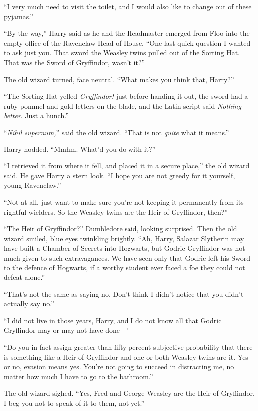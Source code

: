 “I very much need to visit the toilet, and I would also like to change out of these pyjamas.”

\later

“By the way,” Harry said as he and the Headmaster emerged from Floo into the empty office of the Ravenclaw Head of House. “One last quick question I wanted to ask just you. That sword the Weasley twins pulled out of the Sorting Hat. That was the Sword of Gryffindor, wasn’t it?”

The old wizard turned, face neutral. “What makes you think that, Harry?”

“The Sorting Hat yelled \emph{Gryffindor!} just before handing it out, the sword had a ruby pommel and gold letters on the blade, and the Latin script said \emph{Nothing better}. Just a hunch.”

“\emph{Nihil supernum,}” said the old wizard. “That is not \emph{quite} what it means.”

Harry nodded. “Mmhm. What’d you do with it?”

“I retrieved it from where it fell, and placed it in a secure place,” the old wizard said. He gave Harry a stern look. “I hope you are not greedy for it yourself, young Ravenclaw.”

“Not at all, just want to make sure you’re not keeping it permanently from its rightful wielders. So the Weasley twins are the Heir of Gryffindor, then?”

“The Heir of Gryffindor?” Dumbledore said, looking surprised. Then the old wizard smiled, blue eyes twinkling brightly. “Ah, Harry, Salazar Slytherin may have built a Chamber of Secrets into Hogwarts, but Godric Gryffindor was not much given to such extravagances. We have seen only that Godric left his Sword to the defence of Hogwarts, if a worthy student ever faced a foe they could not defeat alone.”

“That’s not the same as saying no. Don’t think I didn’t notice that you didn’t actually say no.”

“I did not live in those years, Harry, and I do not know all that Godric Gryffindor may or may not have done—”

“Do you in fact assign greater than fifty percent subjective probability that there is something like a Heir of Gryffindor and one or both Weasley twins are it. Yes or no, evasion means yes. You’re not going to succeed in distracting me, no matter how much I have to go to the bathroom.”

The old wizard sighed. “Yes, Fred and George Weasley are the Heir of Gryffindor. I beg you not to speak of it to them, not yet.”

